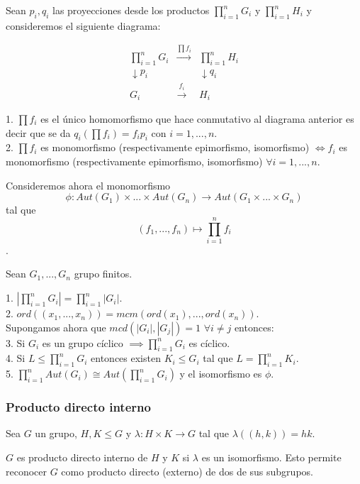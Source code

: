 Sean $p_i,q_i$ las proyecciones desde los productos $\prod_{i=1}^{n} G_i$ y $\prod_{i=1}^{n} H_i$ y consideremos el siguiente diagrama:

$$
\begin{matrix}
\prod_{i=1}^{n} G_i&\stackrel{\prod f_i}{\longrightarrow}&\prod_{i=1}^{n} H_i\\
\downarrow{p_i}&&\downarrow{q_i}\\
G_i&\stackrel{f_i}{\longrightarrow}&H_i
\end{matrix}
$$

\begin{nprop}
1. $\prod f_i$ es el único homomorfismo que hace conmutativo al diagrama anterior es decir que se da $q_i(\prod f_i) = f_i p_i$ con $i=1,...,n$.\\
2. $\prod f_i$ es monomorfismo (respectivamente epimorfismo, isomorfismo) $\iff f_i$ es monomorfismo (respectivamente epimorfismo, isomorfismo) $\forall i=1,...,n$.
\end{nprop}

Consideremos ahora el monomorfismo $$\phi:Aut(G_1) \times ... \times Aut(G_n) \rightarrow Aut(G_1 \times ... \times G_n)$$ tal que $$(f_1,...,f_n) \mapsto \prod_{i=1}^{n} f_i$$.

\begin{nth}
Sean $G_1,...,G_n$ grupo finitos.

1. $|\prod_{i=1}^{n} G_i| = \prod_{i=1}^{n} |G_i|$.\\
2. $ord((x_1,...,x_n)) = mcm(ord(x_1),...,ord(x_n))$.\\
Supongamos ahora que $mcd(|G_i|,|G_j|) = 1$ $\forall i \neq j$ entonces:\\
3. Si $G_i$ es un grupo cíclico $\implies \prod_{i=1}^{n} G_i$ es cíclico.\\
4. Si $L \le \prod_{i=1}^{n} G_i$ entonces existen $K_i \le G_i$ tal que $L = \prod_{i=1}^{n} K_i$.\\
5. $\prod_{i=1}^{n} Aut(G_i) \cong Aut(\prod_{i=1}^{n} G_i)$ y el isomorfismo es $\phi$.
\end{nth}

\subsubsection{Producto directo interno}

\begin{ndef}
Sea $G$ un grupo, $H,K \le G$ y $\lambda:H \times K \rightarrow G$ tal que $\lambda((h,k)) = hk$.

$G$ es producto directo interno de $H$ y $K$ si $\lambda$ es un isomorfismo. Esto permite reconocer $G$ como producto directo (externo) de dos de sus subgrupos.
\end{ndef}


